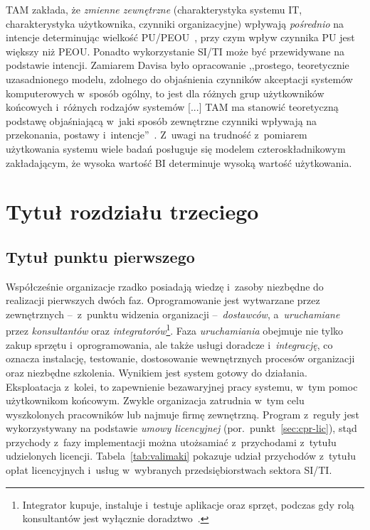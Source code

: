\documentclass[brudnopis,xodstep]{wkmgr}
\def\SITI{SI/TI} %
\begin{document}
TAM zakłada, że \emph{zmienne zewnętrzne\/} (charakterystyka systemu IT,
charakterystyka użytkownika, czynniki organizacyjne) wpływają
\emph{pośrednio\/} na intencje determinując wielkość 
PU/PEOU~\cite[s.~187]{VenkateshDavis00},
przy czym wpływ czynnika PU jest większy niż PEOU. Ponadto wykorzystanie {\SITI}
może być przewidywane na podstawie intencji.
Zamiarem Davisa było opracowanie  ,,prostego, teoretycznie 
uzasadnionego modelu, zdolnego do objaśnienia czynników 
akceptacji systemów komputerowych w~sposób ogólny, to jest dla różnych grup użytkowników
końcowych i~różnych rodzajów systemów [...] TAM ma stanowić teoretyczną
podstawę objaśniającą w~jaki sposób zewnętrzne czynniki wpływają 
na przekonania, postawy i~intencje''~\cite[s.~985]{Davis1989}.
Z~uwagi na trudność z~pomiarem użytkowania systemu wiele badań posługuje się
modelem czteroskładnikowym zakładającym, 
że wysoka 
wartość BI determinuje wysoką wartość użytkowania.

\chapter{Tytuł rozdziału trzeciego}

\section{Tytuł punktu pierwszego}

Współcześnie organizacje rzadko posiadają wiedzę i~zasoby niezbędne do
realizacji pierwszych dwóch faz.  Oprogramowanie jest wytwarzane przez
zewnętrznych --~z~punktu widzenia organizacji --~\emph{dostawców},
a~\emph{uruchamiane} przez
\emph{konsultantów\/} oraz \emph{integratorów}\footnote{%
 Integrator kupuje, instaluje i~testuje aplikacje 
 oraz sprzęt, podczas gdy rolą konsultantów jest 
 wyłącznie doradztwo~\citep{MesserschmittSzyperski03}.}.  
Faza
\emph{uruchamiania\/} obejmuje nie tylko zakup sprzętu
i~oprogramowania, ale także 
usługi doradcze 
i~\emph{integrację}, co oznacza instalację,
testowanie, dostosowanie wewnętrznych procesów organizacji
oraz niezbędne szkolenia. 
Wynikiem 
jest system gotowy do działania.
Eksploatacja z~kolei, to zapewnienie bezawaryjnej pracy systemu,
w~tym pomoc użytkownikom końcowym. 
Zwykle organizacja zatrudnia w~tym celu wyszkolonych 
pracowników 
lub najmuje firmę zewnętrzną.  
Program z~reguły jest wykorzystywany na podstawie \emph{umowy licencyjnej\/}
(por.~punkt~\ref{sec:cpr-lic}), stąd przychody z~fazy
implementacji można utożsamiać z~przychodami z~tytułu udzielonych
licencji.  Tabela~\ref{tab:valimaki} pokazuje 
udział przychodów z~tytułu opłat licencyjnych
 i~usług w~wybranych 
przedsiębiorstwach sektora {\SITI}.
\end{document}
